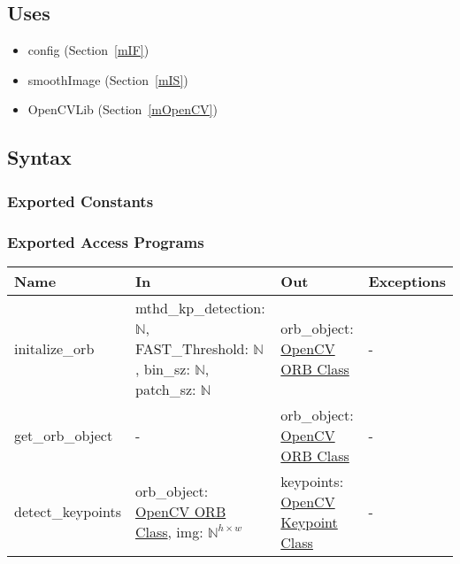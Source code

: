 \documentclass[12pt, titlepage]{article}
\begin{document}
\subsection{Uses}
\begin{itemize}
  \item config (Section~\ref{mIF})
  \item smoothImage (Section~\ref{mIS}) %
  \item OpenCVLib (Section~\ref{mOpenCV})
\end{itemize}

\subsection{Syntax}

\subsubsection{Exported Constants}

\subsubsection{Exported Access Programs}

\begin{center}
\begin{tabular}{p{4cm} p{4.5cm} p{4cm} p{2cm}}
\hline
\textbf{Name} & \textbf{In} & \textbf{Out} & \textbf{Exceptions} \\
\hline
initalize\_orb 
& mthd\_kp\_detection: $\mathbb{N}$,\newline
FAST\_Threshold: $\mathbb{N}$, \newline
bin\_sz: $\mathbb{N}$, \newline
patch\_sz: $\mathbb{N}$
& orb\_object: \href{https://docs.opencv.org/3.4/db/d95/classcv_1_1ORB.html}{OpenCV ORB Class}
& - \\
\hline
get\_orb\_object 
& -
& orb\_object: \href{https://docs.opencv.org/3.4/db/d95/classcv_1_1ORB.html}{OpenCV ORB Class}
& - \\
\hline
detect\_keypoints 
& orb\_object: \href{https://docs.opencv.org/3.4/db/d95/classcv_1_1ORB.html}{OpenCV ORB Class}, \newline
img: $\mathbb{N}^{h \times w}$
& keypoints: \href{https://docs.opencv.org/3.4/d2/d29/classcv_1_1KeyPoint.html}{OpenCV Keypoint Class}
& - \\
\hline
\end{tabular}
\end{center}
\end{document}
